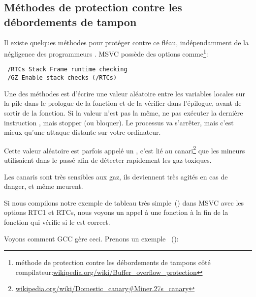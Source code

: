 \subsection{Méthodes de protection contre les débordements de tampon}
\label{subsec:BO_protection}

Il existe quelques méthodes pour protéger contre ce fléau, indépendamment de la négligence
des programmeurs \CCpp.
MSVC possède des options comme\footnote{méthode de protection contre les débordements
de tampons côté compilateur:\href{http://en.wikipedia.org/wiki/Buffer_overflow_protection}{wikipedia.org/wiki/Buffer\_overflow\_protection}}:

\begin{lstlisting}
 /RTCs Stack Frame runtime checking
 /GZ Enable stack checks (/RTCs)
\end{lstlisting}


Une des méthodes est d'écrire une valeur aléatoire entre les variables locales sur
la pile dans le prologue de la fonction et de la vérifier dans l'épilogue, avant de
sortir de la fonction.
Si la valeur n'est pas la même, ne pas exécuter la dernière instruction \RET, mais
stopper (ou bloquer).
Le processus va s'arrêter, mais c'est mieux qu'une attaque distante sur votre ordinateur.
    
\newcommand{\CANARYURL}{\href{http://en.wikipedia.org/wiki/Domestic_Canary\#Miner.27s_canary}{wikipedia.org/wiki/Domestic\_canary\#Miner.27s\_canary}}


Cette valeur aléatoire est parfois appelé un , c'est lié au canari\footnote{\CANARYURL}
que les mineurs utilisaient dans le passé afin de détecter rapidement les gaz toxiques.

Les canaris sont très sensibles aux gaz, ils deviennent très agités en cas de danger,
et même meurent.

Si nous compilons notre exemple de tableau très simple~() dans
\ac{MSVC} avec les options RTC1 et RTCs, nous voyons un appel à 
une fonction à la fin de la fonction qui vérifie si le  est correct.

Voyons comment GCC gère ceci.
Prenons un exemple ~():



